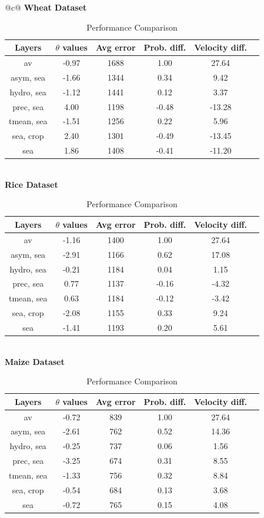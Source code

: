 \begin{table}[ht]
\centering
\caption{Performance Comparison}
\label{tab:results}
\begin{tabular}{@{}c@{}}
\toprule
\textbf{Wheat Dataset}\\
\begin{tabular}{cccccc}
\toprule
Layers & $\theta$ values & Avg error & Prob. diff. & Velocity diff. \\ 
\midrule
av & -0.97 & 1688 & 1.00 & 27.64 \\ 
asym, sea & -1.66 & 1344 & 0.34 & 9.42 \\ 
hydro, sea & -1.12 & 1441 & 0.12 & 3.37 \\ 
prec, sea & 4.00 & 1198 & -0.48 & -13.28 \\ 
tmean, sea & -1.51 & 1256 & 0.22 & 5.96 \\ 
sea, crop & 2.40 & 1301 & -0.49 & -13.45 \\ 
sea & 1.86 & 1408 & -0.41 & -11.20 \\ 
\bottomrule
\end{tabular}
\\[2ex]
\textbf{Rice Dataset}\\
\begin{tabular}{cccccc}
\toprule
Layers & $\theta$ values & Avg error & Prob. diff. & Velocity diff. \\ 
\midrule
av & -1.16 & 1400 & 1.00 & 27.64 \\ 
asym, sea & -2.91 & 1166 & 0.62 & 17.08 \\ 
hydro, sea & -0.21 & 1184 & 0.04 & 1.15 \\ 
prec, sea & 0.77 & 1137 & -0.16 & -4.32 \\ 
tmean, sea & 0.63 & 1184 & -0.12 & -3.42 \\ 
sea, crop & -2.08 & 1155 & 0.33 & 9.24 \\ 
sea & -1.41 & 1193 & 0.20 & 5.61 \\ 
\bottomrule
\end{tabular}
\\[2ex]
\textbf{Maize Dataset}\\
\begin{tabular}{cccccc}
\toprule
Layers & $\theta$ values & Avg error & Prob. diff. & Velocity diff. \\ 
\midrule
av & -0.72 & 839 & 1.00 & 27.64 \\ 
asym, sea & -2.61 & 762 & 0.52 & 14.36 \\ 
hydro, sea & -0.25 & 737 & 0.06 & 1.56 \\ 
prec, sea & -3.25 & 674 & 0.31 & 8.55 \\ 
tmean, sea & -1.33 & 756 & 0.32 & 8.84 \\ 
sea, crop & -0.54 & 684 & 0.13 & 3.68 \\ 
sea & -0.72 & 765 & 0.15 & 4.08 \\ 
\bottomrule
\end{tabular}
\bottomrule
\end{tabular}
\end{table}
